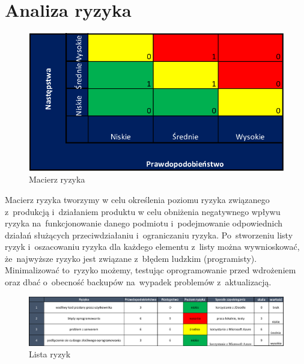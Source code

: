 \documentclass{article}
\begin{document}
\section{Analiza ryzyka}


\begin{figure}[H]
	\centering
	\includegraphics[width=.5\linewidth]{macierz_ryzyka.png}
	\caption{Macierz ryzyka}
\end{figure}

Macierz ryzyka tworzymy w celu określenia poziomu ryzyka związanego z~produkcją i~działaniem produktu w celu obniżenia negatywnego wpływu ryzyka na~funkcjonowanie danego podmiotu i~podejmowanie odpowiednich działań służących przeciwdziałaniu i~ograniczaniu ryzyka. Po~stworzeniu listy ryzyk i~oszacowaniu ryzyka dla każdego elementu z~listy można wywnioskować, że~najwyższe ryzyko jest związane z~błędem ludzkim (programisty). Minimalizować to~ryzyko możemy, testując oprogramowanie przed wdrożeniem oraz dbać o~obecność backupów na~wypadek problemów z~aktualizacją.

\begin{figure}[H]
	\centering
	\includegraphics[width=.95\linewidth]{lista_ryzyk.png}
	\caption{Lista ryzyk}
\end{figure}
\end{document}
